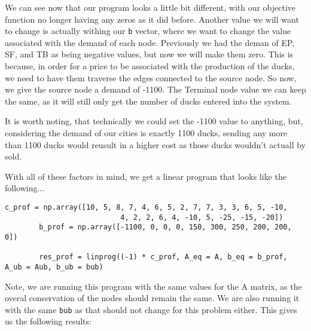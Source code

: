 \documentclass[11pt]{article}
\begin{document}
    We can see now that our program looks a little bit different, with our
    objective function no longer having any zeros as it did before. Another
    value we will want to change is actually withing our \texttt{b} vector,
    where we want to change the value associated with the demand of each node.
    Previously we had the deman of EP, SF, and TB as being negative values, but
    now we will make them zero. This is because, in order for a price to be
    associated with the production of the ducks, we need to have them traverse
    the edges connected to the source node. So now, we give the source node a
    demand of -1100. The Terminal node value we can keep the same, as it
    will still only get the number of ducks entered into the system.

    It is worth noting, that technically we could set the -1100 value to
    anything, but, considering the demand of our cities is exactly 1100 ducks,
    sending any more than 1100 ducks would reusult in a higher cost as those
    ducks wouldn't actuall by sold.

    \newpage

    With all of these factors in mind, we get a linear program that looks like
    the following...

    \begin{lstlisting}[style=mystyle, gobble=8]
        c_prof = np.array([10, 5, 8, 7, 4, 6, 5, 2, 7, 7, 3, 3, 6, 5, -10, 
                           4, 2, 2, 6, 4, -10, 5, -25, -15, -20])
        b_prof = np.array([-1100, 0, 0, 0, 150, 300, 250, 200, 200, 0])
        
        res_prof = linprog((-1) * c_prof, A_eq = A, b_eq = b_prof, A_ub = Aub, b_ub = bub)
    \end{lstlisting}
    Note, we are running this program with the same values for the A matrix, as
    the overal conservation of the nodes should remain the same. We are also
    running it with the same \texttt{bub} as that should not change for this
    problem either.
    This gives us the following results:
\end{document}
